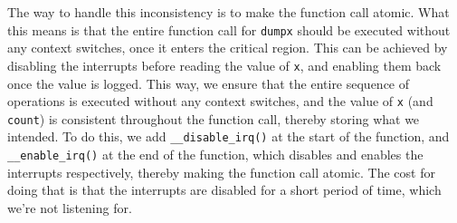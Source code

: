 \vspace*{1em}

The way to handle this inconsistency is to make the function call atomic.
What this means is that the entire function call for \texttt{dumpx} should be executed without any context switches, once it enters the critical region.
This can be achieved by disabling the interrupts before reading the value of \texttt{x}, and enabling them back once the value is logged.
This way, we ensure that the entire sequence of operations is executed without any context switches, and the value of \texttt{x} (and \texttt{count}) is consistent throughout the function call, thereby storing what we intended.
To do this, we add \texttt{\_\_disable\_irq()} at the start of the function, and \texttt{\_\_enable\_irq()} at the end of the function, which disables and enables the interrupts respectively, thereby making the function call atomic.
The cost for doing that is that the interrupts are disabled for a short period of time, which we're not listening for.
